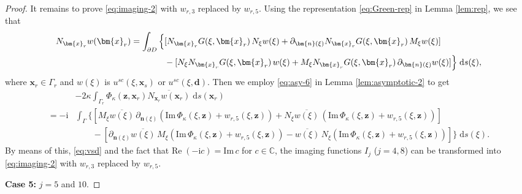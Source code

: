 \documentclass[10pt,a4paper]{article}
\numberwithin{equation}{section}
\begin{document}
\begin{proof}
 It remains to prove   \eqref{eq:imaging-2}  with $w_{r,3}$ replaced by $w_{r,5}$.
 Using the representation \eqref{eq:Green-rep} in Lemma \ref{lem:rep}, we see that
   \begin{align*}
N_{\bm{x}_r} w(\bm{x}_r) = 
\int_{\partial D}\Big\{ &[N_{\bm{x}_r}G(\xi,\bm{x}_r) \, N_{\xi} w(\xi )
                + \partial_{\bm{n}(\xi)}N_{\bm{x}_r}G(\xi,\bm{x}_r) \, M_{\xi} w(\xi )  ]\\
&-[N_{\xi}N_{\bm{x}_r}G(\xi,\bm{x}_r)\, w(\xi )
+ M_{\xi}N_{\bm{x}_r}G(\xi,\bm{x}_r)\,  \partial_{\bm{n}(\xi)} w(\xi ) ] 
  \Big\} {\;\rm d}s(\xi) ,
  \end{align*} 
  where $\bm{x}_r\in\Gamma_r$ and  $w(\xi)$ is $ u^{sc}(\xi,\bm{x}_s)$  or $u^{sc}(\xi,\bm{d})$.
Then we employ \eqref{eq:asy-6} in  Lemma \ref{lem:asymptotic-2} to get
    \begin{align*}
   & -2 \kappa \int_{ \Gamma_{r} } \Phi_{\kappa}(\bm{ z },\bm{ x }_r) \overline{ N_{\bm{x}_r}w(\bm{ x }_{r})} \;\mathrm{d}s(\bm{ x }_r) \\
    =-\mathrm{ i }  &  \int_{ \Gamma } \Big\{ [M_{\xi}\overline{w(\xi)} \, \partial_{\bm{n}(\xi )}
        (\mathrm{Im}\, \Phi_{\kappa}(\xi,\bm{z}) + w_{r,5}(\xi,\bm{z}) )
        +N_{\xi } \overline{w(\xi)} \,
         (\mathrm{Im}\, \Phi_{\kappa}(\xi,\bm{z}) + w_{r,5}(\xi,\bm{z}) ) ]  \\
   & \qquad - [ \partial_{\bm{n}(\xi )}\overline{w(\xi)}\, M_{\xi }
     ( \mathrm{Im}\, \Phi_{\kappa}(\xi,\bm{z}) + w_{r,5}(\xi,\bm{z})  )
     - \overline{w(\xi)}  \, N_{\xi }
     ( \mathrm{Im}\, \Phi_{\kappa}(\xi,\bm{z}) + w_{r,5}(\xi,\bm{z}) )
     ]  \Big\} \;\mathrm{d}s(\xi). 
  \end{align*}
By means of this, \eqref{eq:vsd} and the fact that $\mathrm{Re}\;( -\mathrm{ i } c)=\mathrm{Im}\,c$ for $c \in \mathbb{C}$, the imaging functions $I_j$ ($j=4,8$) can be transformed into  \eqref{eq:imaging-2}  with $w_{r,3}$ replaced by $w_{r,5}$.

   \textbf{Case 5:} $j=5$ and $10$.


\end{proof}
\end{document}

